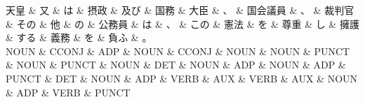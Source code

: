 \documentclass[tikz,border=5pt]{standalone}
\begin{document}
\normalsize
\begin{dependency}[edge unit distance=12.0pt]
    \begin{deptext}[column sep=1em]
        天皇 \& 又 \& は \& 摂政 \& 及び \& 国務 \& 大臣 \& 、 \& 国会議員 \& 、 \& 裁判官 \& その \& 他 \& の \& 公務員 \& は \& 、 \& この \& 憲法 \& を \& 尊重 \& し \& 擁護 \& する \& 義務 \& を \& 負ふ \& 。\\
        NOUN \& CCONJ \& ADP \& NOUN \& CCONJ \& NOUN \& NOUN \& PUNCT \& NOUN \& PUNCT \& NOUN \& DET \& NOUN \& ADP \& NOUN \& ADP \& PUNCT \& DET \& NOUN \& ADP \& VERB \& AUX \& VERB \& AUX \& NOUN \& ADP \& VERB \& PUNCT\\
    \end{deptext}
\end{dependency}
\end{document}
